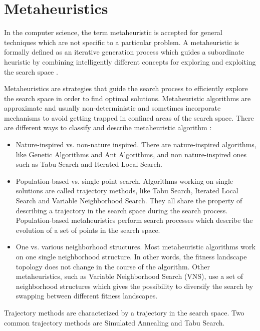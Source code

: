 \documentclass[review]{elsarticle}
\begin{document}
\section{Metaheuristics}

In the computer science, the term metaheuristic is accepted for general techniques which are not specific to a particular problem. A metaheuristic is formally defined as an iterative generation process which guides a subordinate heuristic by combining intelligently different concepts for exploring and exploiting the search space \cite{raidl2010metaheuristic}. 

Metaheuristics are strategies that guide the search process to efficiently explore the search space in order to find optimal solutions. Metaheuristic algorithms are approximate and usually non-deterministic and sometimes incorporate mechanisms to avoid getting trapped in confined areas of the search space. There are different ways to classify and describe metaheuristic algorithm \cite{Blum2003}:

\begin{itemize}
\item Nature-inspired vs. non-nature inspired. There are nature-inspired algorithms, like Genetic Algorithms and Ant Algorithms, and non nature-inspired ones such as Tabu Search and Iterated Local Search. 

\item Population-based vs. single point search. Algorithms working on single solutions are called trajectory methods, like Tabu Search, Iterated Local Search and Variable Neighborhood Search. They all share the property of describing a trajectory in the search space during the search process. Population-based metaheuristics perform search processes which describe the evolution of a set of points in the search space.

\item One vs. various neighborhood structures. Most metaheuristic algorithms work on one single neighborhood structure. In other words, the fitness landscape topology does not change in the course of the algorithm. Other metaheuristics, such as Variable Neighborhood Search (VNS), use a set of neighborhood structures which gives the possibility to diversify the search by swapping between different fitness
landscapes.


\end{itemize}

Trajectory methods are characterized by a trajectory in the search space. Two common trajectory methods are Simulated Annealing and Tabu Search.
\end{document}
